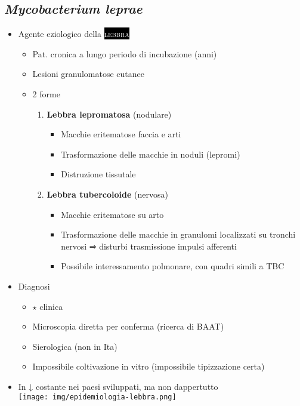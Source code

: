 \documentclass[italian,]{article}
\providecommand{\tightlist}{%
  \setlength{\itemsep}{0pt}\setlength{\parskip}{0pt}}
\newcommand{\pat}[1]{\colorbox{black}{\textcolor{white}{\textsc{#1}}}}
\newcommand{\goldstandard}{\textcircled{$\star$} }                      %
\begin{document}
\hypertarget{mycobacterium-leprae}{%
\subsection{\texorpdfstring{\emph{Mycobacterium
leprae}}{Mycobacterium leprae}}\label{mycobacterium-leprae}}

\begin{itemize}
\tightlist
\item
  Agente eziologico della \pat{lebbra}

  \begin{itemize}
  \tightlist
  \item
    Pat. cronica a lungo periodo di incubazione (anni)
  \item
    Lesioni granulomatose cutanee
  \item
    2 forme

    \begin{enumerate}
    \def\labelenumi{\arabic{enumi}.}
    \tightlist
    \item
      \textbf{Lebbra lepromatosa} (nodulare)

      \begin{itemize}
      \tightlist
      \item
        Macchie eritematose faccia e arti
      \item
        Trasformazione delle macchie in noduli (lepromi)
      \item
        Distruzione tissutale
      \end{itemize}
    \item
      \textbf{Lebbra tubercoloide} (nervosa)

      \begin{itemize}
      \tightlist
      \item
        Macchie eritematose su arto
      \item
        Trasformazione delle macchie in granulomi localizzati su tronchi
        nervosi ⇒ disturbi trasmissione impulsi afferenti
      \item
        Possibile interessamento polmonare, con quadri simili a TBC
      \end{itemize}
    \end{enumerate}
  \end{itemize}
\item
  Diagnosi

  \begin{itemize}
  \tightlist
  \item
    \goldstandard clinica
  \item
    Microscopia diretta per conferma (ricerca di BAAT)
  \item
    Sierologica (non in Ita)
  \item
    Impossibile coltivazione in vitro (impossibile tipizzazione certa)
  \end{itemize}
\item
  In ↓ costante nei paesi sviluppati, ma non dappertutto\\
  \texttt{[image: img/epidemiologia-lebbra.png]}


\end{itemize}
\end{document}
